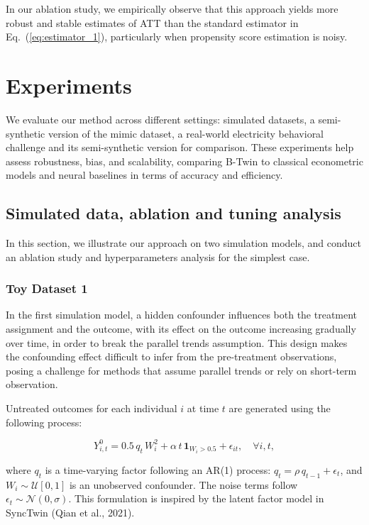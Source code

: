 \documentclass[10pt]{article} %
\begin{document}
\noindent In our ablation study, we empirically observe that this approach yields more robust and stable estimates of ATT than the standard estimator in Eq.~(\ref{eq:estimator_1}), particularly when propensity score estimation is noisy.

\section{Experiments }
We evaluate our method across different settings: simulated datasets, a semi-synthetic version of the mimic dataset, a real-world electricity behavioral challenge and its semi-synthetic version for comparison. These experiments help assess robustness, bias, and scalability, comparing B-Twin to classical econometric models and neural baselines in terms of accuracy and efficiency.
\subsection{Simulated data, ablation and tuning analysis}
In this section, we illustrate our approach on two simulation models, and conduct an ablation study and hyperparameters analysis for the simplest case.

\subsubsection{Toy Dataset 1}

In the first simulation model, a hidden confounder influences both the treatment assignment and the outcome, with its effect on the outcome increasing gradually over time, in order to break the parallel trends assumption. This design makes the confounding effect difficult to infer from the pre-treatment observations, posing a challenge for methods that assume parallel trends or rely on short-term observation.

Untreated outcomes for each individual \( i \) at time \( t \) are generated using the following process:

\[
Y^0_{i,t} = 0.5\, q_t\, W_i^2 + \alpha\, t\, \mathbf{1}_{W_i > 0.5} + \epsilon_{it}, \quad \forall i, t ,
\]

where \( q_t \) is a time-varying factor following an AR(1) process: \( q_t = \rho\, q_{t-1} + \epsilon_t \), and \( W_i \sim \mathcal{U}[0,1] \) is an unobserved confounder. The noise terms follow \( \epsilon_t \sim \mathcal{N}(0, \sigma) \). This formulation is inspired by the latent factor model in SyncTwin (Qian et al., 2021).
\end{document}
